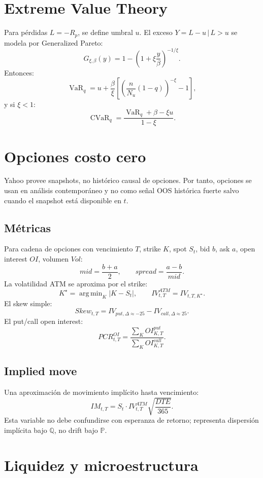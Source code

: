 \documentclass[11pt,letterpaper]{article}
\DeclareMathOperator*{\argmin}{arg\,min}
\DeclareMathOperator{\CVaR}{CVaR}
\DeclareMathOperator{\VaR}{VaR}
\newcommand{\Prob}{\mathbb{P}}
\newcommand{\Q}{\mathbb{Q}}
\newcommand{\1}{\mathbf{1}}
\newcommand{\given}{\,|\,}
\begin{document}
\section{Extreme Value Theory}

Para pérdidas \(L=-R_p\), se define umbral \(u\). El exceso \(Y=L-u\given L>u\) se modela por Generalized Pareto:
\[
    G_{\xi,\beta}(y)
    =
    1-\left(1+\xi\frac{y}{\beta}\right)^{-1/\xi}.
\]
Entonces:
\[
    \VaR_q
    =
    u+\frac{\beta}{\xi}
    \left[
        \left(
            \frac{n}{N_u}(1-q)
        \right)^{-\xi}
        -1
    \right],
\]
y si \(\xi<1\):
\[
    \CVaR_q
    =
    \frac{\VaR_q+\beta-\xi u}{1-\xi}.
\]

\newpage
\section{Opciones costo cero}

Yahoo provee snapshots, no histórico causal de opciones. Por tanto, opciones se usan en análisis contemporáneo y no como señal OOS histórica fuerte salvo cuando el snapshot está disponible en \(t\).

\subsection{Métricas}

Para cadena de opciones con vencimiento \(T\), strike \(K\), spot \(S_t\), bid \(b\), ask \(a\), open interest \(OI\), volumen \(Vol\):
\[
    mid=\frac{b+a}{2},
    \qquad
    spread=\frac{a-b}{mid}.
\]
La volatilidad ATM se aproxima por el strike:
\[
    K^\star = \argmin_K |K-S_t|,
    \qquad
    IV^{ATM}_{t,T}=IV_{t,T,K^\star}.
\]
El skew simple:
\[
    Skew_{t,T}
    =
    IV_{put,\Delta\approx -25}
    -
    IV_{call,\Delta\approx 25}.
\]
El put/call open interest:
\[
    PCR^{OI}_{t,T}
    =
    \frac{\sum_K OI^{put}_{K,T}}
    {\sum_K OI^{call}_{K,T}}.
\]

\subsection{Implied move}

Una aproximación de movimiento implícito hasta vencimiento:
\[
    IM_{t,T}
    =
    S_t \cdot IV^{ATM}_{t,T}\sqrt{\frac{DTE}{365}}.
\]
Esta variable no debe confundirse con esperanza de retorno; representa dispersión implícita bajo \(\Q\), no drift bajo \(\Prob\).

\newpage
\section{Liquidez y microestructura}
\end{document}
